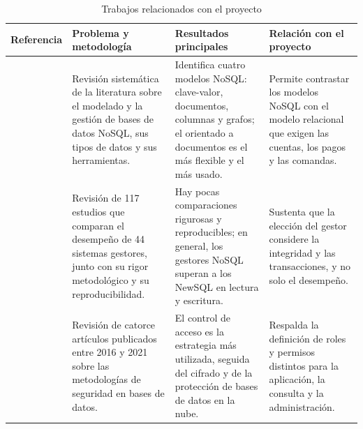 \begin{table}[H]
    \centering
    \footnotesize
    \begin{tabularx}{\textwidth}
        {
            >{\RaggedRight\arraybackslash}p{2.4cm}
            >{\RaggedRight\arraybackslash}X
            >{\RaggedRight\arraybackslash}X
            >{\RaggedRight\arraybackslash}X
        }

        \toprule

        \textbf{Referencia} & \textbf{Problema y metodología} & \textbf{Resultados principales} & \textbf{Relación con el proyecto} \\

        \midrule

        \textcite{aguilar2023} &
        Revisión sistemática de la literatura sobre el modelado y la gestión de bases de datos NoSQL, sus tipos de datos y sus herramientas. &
        Identifica cuatro modelos NoSQL: clave-valor, documentos, columnas y grafos; el orientado a documentos es el más flexible y el más usado. &
        Permite contrastar los modelos NoSQL con el modelo relacional que exigen las cuentas, los pagos y las comandas. \\

        \midrule

        \textcite{taipalus2024} &
        Revisión de 117 estudios que comparan el desempeño de 44 sistemas gestores, junto con su rigor metodológico y su reproducibilidad. &
        Hay pocas comparaciones rigurosas y reproducibles; en general, los gestores NoSQL superan a los NewSQL en lectura y escritura. &
        Sustenta que la elección del gestor considere la integridad y las transacciones, y no solo el desempeño. \\

        \midrule

        \textcite{machuca2022} &
        Revisión de catorce artículos publicados entre 2016 y 2021 sobre las metodologías de seguridad en bases de datos. &
        El control de acceso es la estrategia más utilizada, seguida del cifrado y de la protección de bases de datos en la nube. &
        Respalda la definición de roles y permisos distintos para la aplicación, la consulta y la administración. \\

        \bottomrule

    \end{tabularx}
    \captionsetup{labelfont=bf, textfont=it, labelsep=newline, justification=raggedright, singlelinecheck=false}
    \caption{Trabajos relacionados con el proyecto}
    \label{tab:estado-del-arte}
\end{table}

